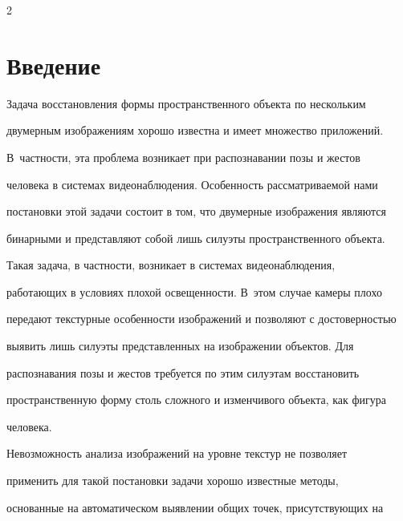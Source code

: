 





      \thispagestyle{headings}



      \begin{multicols}{2}



      \label{st\stat}



\section{Введение}

     

     Задача восстановления формы пространственного объекта по нескольким 

двумерным изображениям хорошо известна и имеет множество приложений. 

В~частности, эта проблема возникает при распознавании позы и жестов 

человека в системах видеонаблюдения. Особенность рассматриваемой нами 

постановки этой задачи состоит в том, что двумерные изображения являются 

бинарными и представляют собой лишь силуэты пространственного объекта. 

Такая задача, в частности, возникает в системах видеонаблюдения, 

работающих в условиях плохой освещенности. В~этом случае камеры плохо 

передают текстурные особенности изображений и позволяют с достоверностью 

выявить лишь силуэты представленных на изображении объектов. Для 

распознавания позы и жестов требуется по этим силуэтам восстановить 

пространственную форму столь сложного и изменчивого объекта, как фигура 

человека.

     

     Невозможность анализа изображений на уровне текстур не позволяет 

применить для такой постановки задачи хорошо известные методы, 

основанные на автоматическом выявлении общих точек, присутствующих на 


\end{multicols}
